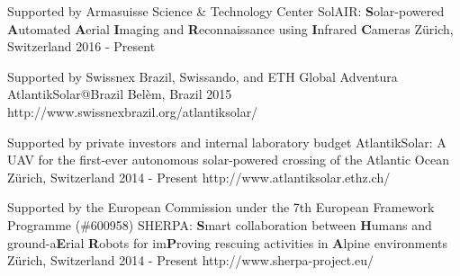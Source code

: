 \label{sec:proj}

\begin{cventries}
  \cvprojentry
    {Supported by Armasuisse Science \& Technology Center} %
    {SolAIR: \textbf{S}olar-powered \textbf{A}utomated \textbf{A}erial \textbf{I}maging and \textbf{R}econnaissance using \textbf{I}nfrared \textbf{C}ameras} %
    {Z\"{u}rich, Switzerland} %
    {2016 - Present} %
    {} %
    {} %
	{}
	
  \cvprojentry
    {Supported by Swissnex Brazil, Swissando, and ETH Global} %
    {Adventura AtlantikSolar@Brazil} %
    {Bel\`{e}m, Brazil} %
    {2015} %
    {} %
    {} %
	{http://www.swissnexbrazil.org/atlantiksolar/}
	
  \cvprojentry
    {Supported by private investors and internal laboratory budget} %
    {AtlantikSolar: A UAV for the first-ever autonomous solar-powered crossing of the Atlantic Ocean} %
    {Z\"{u}rich, Switzerland} %
    {2014 - Present} %
    {} %
    {} %
	{http://www.atlantiksolar.ethz.ch/}
	
  \cvprojentry
    {Supported by the European Commission under the 7th European Framework Programme (\#600958)} %
    {SHERPA: \textbf{S}mart collaboration between \textbf{H}umans and ground-a\textbf{E}rial \textbf{R}obots for im\textbf{P}roving rescuing activities in \textbf{A}lpine environments} %
    {Z\"{u}rich, Switzerland} %
    {2014 - Present} %
    {} %
    {} %
	{http://www.sherpa-project.eu/}


\end{cventries}
